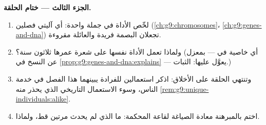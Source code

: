 \begin{problem}
\medskip\noindent\textbf{الجزء الثالث --- ختام
الحلقة.}
\begin{enumerate}[resume]
  \item لخّص الأداة في جملة واحدة: أي آليتي فصلين
        (\cref{ch:g9:chromosomes}،
        \cref{ch:g9:genes-and-dna}) تجعلان البصمة فريدة
        والعائلة مقروءة.
  \item ولماذا تعمل الأداة نفسها على شعرة عمرها ثلاثون
        سنة؟ (أي خاصية في  --- بمعزل عن النسخ في
        \cref{prop:g9:genes-and-dna:explains} --- يعوَّل
        عليها: الثبات.)
  \item وتنتهي الحلقة على الأخلاق: اذكر استعمالين
        للفرادة يبينهما هذا الفصل في خدمة الناس، وسوء
        الاستعمال التاريخي الذي يحذر منه
        \cref{rem:g9:unique-individuals:alike}.
  \item اختم بالمبرهنة معادة الصياغة لقاعة المحكمة: ما
        الذي لم يحدث مرتين قط، ولماذا.
\end{enumerate}
\end{problem}
